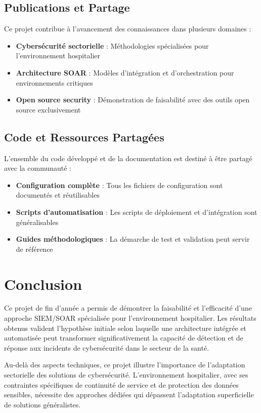 \subsection{Publications et Partage}

Ce projet contribue à l'avancement des connaissances dans plusieurs domaines :

\begin{itemize}
    \item \textbf{Cybersécurité sectorielle} : Méthodologies spécialisées pour l'environnement hospitalier
    \item \textbf{Architecture SOAR} : Modèles d'intégration et d'orchestration pour environnements critiques
    \item \textbf{Open source security} : Démonstration de faisabilité avec des outils open source exclusivement
\end{itemize}

\subsection{Code et Ressources Partagées}

L'ensemble du code développé et de la documentation est destiné à être partagé avec la communauté :

\begin{itemize}
    \item \textbf{Configuration complète} : Tous les fichiers de configuration sont documentés et réutilisables
    \item \textbf{Scripts d'automatisation} : Les scripts de déploiement et d'intégration sont généralisables
    \item \textbf{Guides méthodologiques} : La démarche de test et validation peut servir de référence
\end{itemize}

\section{Conclusion}

Ce projet de fin d'année a permis de démontrer la faisabilité et l'efficacité d'une approche SIEM/SOAR spécialisée pour l'environnement hospitalier. Les résultats obtenus valident l'hypothèse initiale selon laquelle une architecture intégrée et automatisée peut transformer significativement la capacité de détection et de réponse aux incidents de cybersécurité dans le secteur de la santé.

Au-delà des aspects techniques, ce projet illustre l'importance de l'adaptation sectorielle des solutions de cybersécurité. L'environnement hospitalier, avec ses contraintes spécifiques de continuité de service et de protection des données sensibles, nécessite des approches dédiées qui dépassent l'adaptation superficielle de solutions généralistes.

